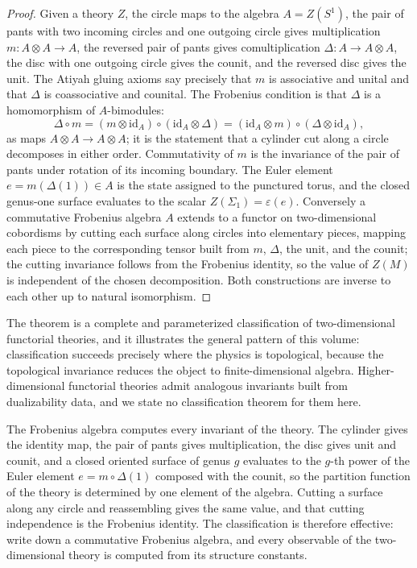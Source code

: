 \documentclass[11pt,letterpaper]{article}
\theoremstyle{definition}
\theoremstyle{remark}
\begin{document}
\begin{proof}
Given a theory $Z$, the circle maps to the algebra $A = Z(S^1)$, the pair of pants with two incoming circles and one outgoing circle gives multiplication $m: A \otimes A \to A$, the reversed pair of pants gives comultiplication $\Delta: A \to A \otimes A$, the disc with one outgoing circle gives the counit, and the reversed disc gives the unit. The Atiyah gluing axioms say precisely that $m$ is associative and unital and that $\Delta$ is coassociative and counital. The Frobenius condition is that $\Delta$ is a homomorphism of $A$-bimodules:
\[
\Delta \circ m = (m \otimes \mathrm{id}_A) \circ (\mathrm{id}_A \otimes \Delta) = (\mathrm{id}_A \otimes m) \circ (\Delta \otimes \mathrm{id}_A),
\]
as maps $A \otimes A \to A \otimes A$; it is the statement that a cylinder cut along a circle decomposes in either order. Commutativity of $m$ is the invariance of the pair of pants under rotation of its incoming boundary. The Euler element $e = m(\Delta(1)) \in A$ is the state assigned to the punctured torus, and the closed genus-one surface evaluates to the scalar $Z(\Sigma_1) = \varepsilon(e)$. Conversely a commutative Frobenius algebra $A$ extends to a functor on two-dimensional cobordisms by cutting each surface along circles into elementary pieces, mapping each piece to the corresponding tensor built from $m$, $\Delta$, the unit, and the counit; the cutting invariance follows from the Frobenius identity, so the value of $Z(M)$ is independent of the chosen decomposition. Both constructions are inverse to each other up to natural isomorphism.
\end{proof}

The theorem is a complete and parameterized classification of two-dimensional functorial theories, and it illustrates the general pattern of this volume: classification succeeds precisely where the physics is topological, because the topological invariance reduces the object to finite-dimensional algebra. Higher-dimensional functorial theories admit analogous invariants built from dualizability data, and we state no classification theorem for them here.

The Frobenius algebra computes every invariant of the theory. The cylinder gives the identity map, the pair of pants gives multiplication, the disc gives unit and counit, and a closed oriented surface of genus $g$ evaluates to the $g$-th power of the Euler element $e = m \circ \Delta(1)$ composed with the counit, so the partition function of the theory is determined by one element of the algebra. Cutting a surface along any circle and reassembling gives the same value, and that cutting independence is the Frobenius identity. The classification is therefore effective: write down a commutative Frobenius algebra, and every observable of the two-dimensional theory is computed from its structure constants.
\end{document}
